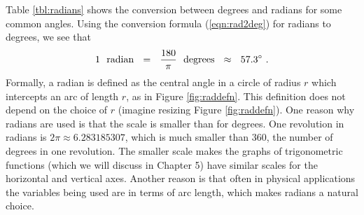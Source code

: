 \piccaption[]{\label{fig:raddefn}}
Table \ref{tbl:radians} shows the conversion between degrees and radians for some common angles.
Using the conversion formula (\ref{eqn:rad2deg}) for radians to degrees, we see that
\begin{displaymath}
 1 ~~\text{radian} ~~=~~ \frac{180}{\pi}~~\text{degrees} ~~\approx~~ 57.3^\circ ~.
\end{displaymath}
Formally, a radian is defined as the central angle in a circle of radius $r$ which intercepts an arc
of length $r$, as in Figure \ref{fig:raddefn}. This definition does not depend on the choice of $r$
(imagine resizing Figure \ref{fig:raddefn}).
\newpage
One reason why radians are used is that the scale is smaller than for degrees.
One revolution in radians is $2\pi \approx 6.283185307$, which is much smaller
than $360$, the number of degrees in one revolution. The smaller scale makes the graphs of
trigonometric functions (which we will discuss in Chapter 5) have similar scales for the horizontal
and vertical axes.
Another reason is that often in physical applications the variables being used are in terms of
arc length, which makes radians a natural choice.


